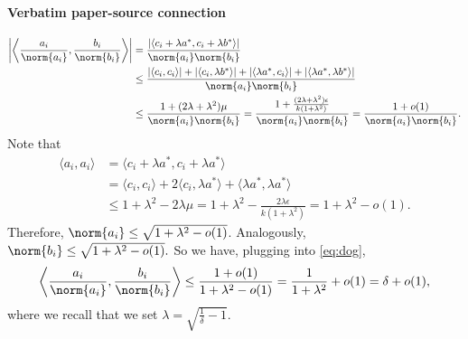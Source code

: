 \documentclass[10pt]{article}
\begin{document}
\paragraph{Verbatim paper-source connection}
\begin{ReviewVerbatim}
\begin{align}
        \left|\left\langle \frac{a_i}{\norm{a_i}}, \frac{b_i}{\norm{b_i}} \right\rangle\right|
        &= \frac{|\langle c_i + \lambda a^*, c_i + \lambda b^*\rangle|}{\norm{a_i}\norm{b_i}}\\
        &\le \frac{|\langle c_i, c_i\rangle| + |\langle c_i, \lambda b^*\rangle| + |\langle \lambda a^*, c_i \rangle| + |\langle \lambda a^*, \lambda b^* \rangle|}{\norm{a_i}\norm{b_i}}\\
        &\le \frac{1 + (2\lambda  + \lambda^2)\mu}{\norm{a_i}\norm{b_i}} = \frac{1 + \frac{(2\lambda  + \lambda^2)\epsilon}{k(1+\lambda^2)}}{\norm{a_i}\norm{b_i}} = \frac{1 + o(1)}{\norm{a_i}\norm{b_i}}.\label{eq:dog}
    \end{align}
    Note that
    \begin{align}
        \langle a_i, a_i\rangle &= \langle c_i + \lambda a^*, c_i + \lambda a^* \rangle\\ &= \langle c_i, c_i\rangle + 2\langle c_i, \lambda a^*\rangle + \langle \lambda a^*, \lambda a^*\rangle\\
        &\le 1 + \lambda^2 - 2\lambda\mu =  1 + \lambda^2 - \frac{2\lambda\epsilon}{k(1+\lambda^2)} = 1 + \lambda^2 - o(1).
    \end{align}
    Therefore, $\norm{a_i} \le \sqrt{1 + \lambda^2 - o(1)}$. Analogously, $\norm{b_i} \le \sqrt{1 + \lambda^2 - o(1)}.$
    So we have, plugging into \eqref{eq:dog},
    \begin{align}
         \left\langle \frac{a_i}{\norm{a_i}}, \frac{b_i}{\norm{b_i}} \right\rangle
         \le \frac{1 + o(1)}{1 + \lambda^2 - o(1)} = \frac{1}{1 + \lambda^2} + o(1) = \delta + o(1),
    \end{align}
    where we recall that we set $\lambda = \sqrt{\frac{1}{\delta} - 1}.$


\end{ReviewVerbatim}
\end{document}
